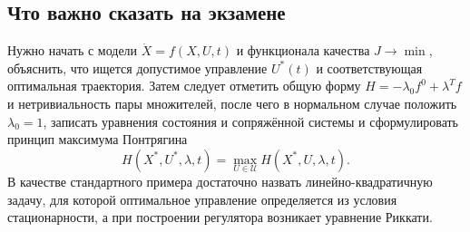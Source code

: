 \subsection{Что важно сказать на экзамене}

Нужно начать с модели $\dot X=f(X,U,t)$ и функционала качества $J\to\min$,
объяснить, что ищется допустимое управление $U^*(t)$ и соответствующая
оптимальная траектория. Затем следует отметить общую форму $H=-\lambda_0f^0+\lambda^Tf$ и
нетривиальность пары множителей, после чего в нормальном случае положить
$\lambda_0=1$, записать уравнения состояния и сопряжённой системы и
сформулировать принцип максимума Понтрягина
\[
    H(X^*,U^*,\lambda,t)=\max_{U\in\mathcal U}H(X^*,U,\lambda,t).
\]
В качестве стандартного примера достаточно назвать линейно-квадратичную задачу,
для которой оптимальное управление определяется из условия стационарности, а
при построении регулятора возникает уравнение Риккати.

\newpage
